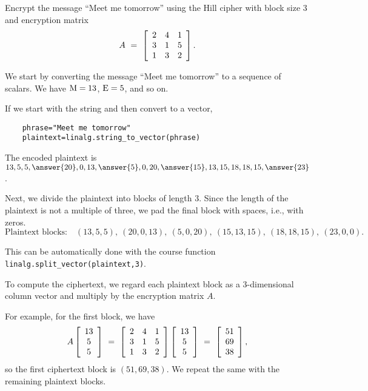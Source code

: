 \documentclass{ximera}
\begin{document}
\begin{example}\label{ex:hill-cipher-encryption}
  Encrypt the message ``Meet me tomorrow'' using the Hill cipher with
  block size $3$ and encryption matrix
  \begin{equation*}
    A ~=~ \startmat{ccc}
      2 & 4 & 1 \\
      3 & 1 & 5 \\
      1 & 3 & 2 \\
    \stopmat.
  \end{equation*}


\begin{solution}
  We start by converting the message ``Meet me tomorrow'' to a sequence
  of scalars. We have $\qq{M}=13$, $\qq{E}=5$, and so on. 
  
  If we start with the string and then convert to a vector,
  
  \begin{verbatim}
    phrase="Meet me tomorrow"
    plaintext=linalg.string_to_vector(phrase)
  \end{verbatim}
  
  The encoded
  plaintext is $13,5,5,\answer{20},0,13,\answer{5},0,20,\answer{15},13,15,18,18,15,\answer{23}$. 
  
  Next, we
  divide the plaintext into blocks of length 3. Since the length of
  the plaintext is not a multiple of three, we pad the final block
  with spaces, i.e., with zeros.
  \begin{equation*}
    \mbox{Plaintext blocks:}\quad
    (13,5,5),\
    (20,0,13),\
    (5,0,20),\
    (15,13,15),\
    (18,18,15),\
    (23,0,0).
  \end{equation*}

  This can be automatically done with the course function \texttt{linalg.split\_vector(plaintext,3)}.

  To compute the ciphertext, we regard each plaintext block as a
  $3$-dimensional column vector and multiply by the encryption matrix
  $A$. 
  
  For example, for the
  first block, we have
  \begin{equation*}
    A \startmat{c} 13 \\ 5 \\ 5 \stopmat
    ~=~ \startmat{ccc}
      2 & 4 & 1 \\
      3 & 1 & 5 \\
      1 & 3 & 2 \\
    \stopmat
    \startmat{c} 13 \\ 5 \\ 5 \stopmat
    ~=~ \startmat{c} 51 \\ 69 \\ 38  \stopmat,
  \end{equation*}
  so the first ciphertext block is $(51 ,69 ,38 )$. We repeat the same
  with the remaining plaintext blocks.


\end{solution}
\end{example}
\end{document}
